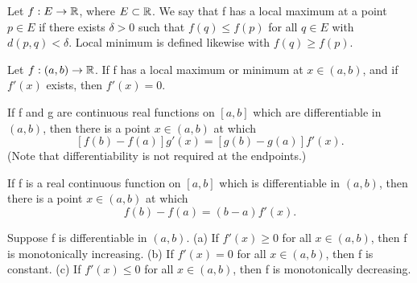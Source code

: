 \begin{definition} %
  \label{def:chap5:local_extrema}
  Let $f: E \to \mathbb{R}$, where $E \subset \mathbb{R}$. We say that f has a
  local maximum at a point $p \in E$ if there exists $\delta > 0$
  such that $f(q) \le f(p)$ for all $q \in E$ with $d(p, q) <
  \delta$. Local minimum is defined likewise with $f(q) \ge f(p)$.
\end{definition}

\begin{theorem} %
  \label{thm:chap5:local_extremum_zero_deriv}
  Let $f: (a, b) \to \mathbb{R}$. If f has a local maximum or minimum at
  $x \in (a, b)$, and if $f'(x)$ exists, then $f'(x) = 0$.
\end{theorem}

\begin{theorem} %
  \label{thm:chap5:cauchy_mvt}
  If f and g are continuous real functions on $[a, b]$ which are
  differentiable in $(a, b)$, then there is a point $x \in (a, b)$ at which
  \[ [f(b) - f(a)]g'(x) = [g(b) - g(a)]f'(x). \]
  (Note that differentiability is not required at the endpoints.)
\end{theorem}

\begin{theorem} %
  \label{thm:chap5:lagrange_mvt}
  If f is a real continuous function on $[a, b]$ which is
  differentiable in $(a, b)$, then there is a point $x \in (a, b)$ at which
  \[ f(b) - f(a) = (b - a)f'(x). \]
\end{theorem}

\begin{theorem} %
  \label{thm:chap5:deriv_sign_monotonicity}
  Suppose f is differentiable in $(a, b)$.
  (a) If $f'(x) \ge 0$ for all $x \in (a, b)$, then f is
  monotonically increasing.
  (b) If $f'(x) = 0$ for all $x \in (a, b)$, then f is constant.
  (c) If $f'(x) \le 0$ for all $x \in (a, b)$, then f is
  monotonically decreasing.
\end{theorem}



